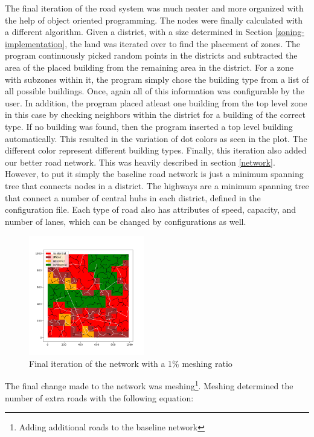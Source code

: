 \documentclass[11pt]{article}
\begin{document}
\begin{multicols}{2}
    \quad The final iteration of the road system was much neater and more organized with the help of object oriented programming. The nodes were finally calculated with a different algorithm. Given a district, with a size determined in Section \ref{zoning-implementation}, the land was iterated over to find the placement of zones. The program continuously picked random points in the districts and subtracted the area of the placed building from the remaining area in the district. For a zone with subzones within it, the program simply chose the building type from a list of all possible buildings. Once, again all of this information was configurable by the user. In addition, the program placed atleast one building from the top level zone in this case by checking neighbors within the district for a building of the correct type. If no building was found, then the program inserted a top level building automatically. This resulted in the variation of dot colors as seen in the plot. The different color represent different building types. Finally, this iteration also added our better road network. This was heavily described in section \ref{network}. However, to put it simply the baseline road network is just a minimum spanning tree that connects nodes in a district. The highways are a minimum spanning tree that connect a number of central hubs in each district, defined in the configuration file. Each type of road also has attributes of speed, capacity, and number of lanes, which can be changed by configurations as well. 

    \begin{figure}[H]
        \centering
        \includegraphics[width=0.45\textwidth]{images/meshednetwork.png}
        \caption{Final iteration of the network with a 1\% meshing ratio}
        \label{fig:first-zoning}
    \end{figure}

    \quad The final change made to the network was meshing\footnote{Adding additional roads to the baseline network}. Meshing determined the number of extra roads with the following equation:


\end{multicols}
\end{document}
